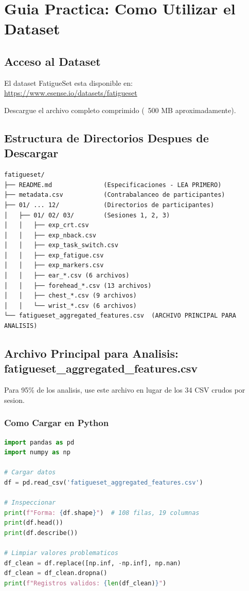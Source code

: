 \chapter{Guia Practica: Como Utilizar el Dataset}
\label{cap:usage_guide}

\section{Acceso al Dataset}

El dataset FatigueSet esta disponible en:
\url{https://www.esense.io/datasets/fatigueset}

Descargue el archivo completo comprimido (~500 MB aproximadamente).

\section{Estructura de Directorios Despues de Descargar}

\begin{verbatim}
fatigueset/
├── README.md              (Especificaciones - LEA PRIMERO)
├── metadata.csv           (Contrabalanceo de participantes)
├── 01/ ... 12/            (Directorios de participantes)
│   ├── 01/ 02/ 03/        (Sesiones 1, 2, 3)
│   │   ├── exp_crt.csv
│   │   ├── exp_nback.csv
│   │   ├── exp_task_switch.csv
│   │   ├── exp_fatigue.csv
│   │   ├── exp_markers.csv
│   │   ├── ear_*.csv (6 archivos)
│   │   ├── forehead_*.csv (13 archivos)
│   │   ├── chest_*.csv (9 archivos)
│   │   └── wrist_*.csv (6 archivos)
└── fatigueset_aggregated_features.csv  (ARCHIVO PRINCIPAL PARA ANALISIS)
\end{verbatim}

\section{Archivo Principal para Analisis: fatigueset\_aggregated\_features.csv}

Para 95\% de los analisis, use este archivo en lugar de los 34 CSV crudos por sesion.

\subsection{Como Cargar en Python}

\begin{lstlisting}[language=Python]
import pandas as pd
import numpy as np

# Cargar datos
df = pd.read_csv('fatigueset_aggregated_features.csv')

# Inspeccionar
print(f"Forma: {df.shape}")  # 108 filas, 19 columnas
print(df.head())
print(df.describe())

# Limpiar valores problematicos
df_clean = df.replace([np.inf, -np.inf], np.nan)
df_clean = df_clean.dropna()
print(f"Registros validos: {len(df_clean)}")
\end{lstlisting}

